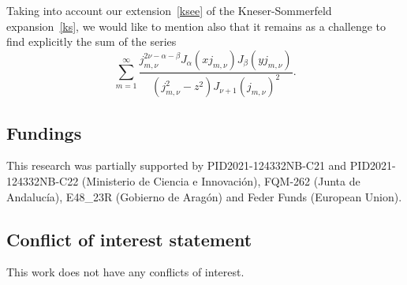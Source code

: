 \documentclass[10pt,leqno,a4paper]{article}
\theoremstyle{plain}
\numberwithin{equation}{section}
\begin{document}
Taking into account our extension~\eqref{ksee} of the Kneser-Sommerfeld expansion~\eqref{ks}, we would like to mention also that it remains as a challenge to find explicitly the sum of the series
\[ %
  \sum_{m=1}^\infty
  \frac{j_{m,\nu}^{2\nu-\alpha-\beta}J_\alpha(x j_{m,\nu})J_\beta(y j_{m,\nu})}
  {(j_{m,\nu}^{2}-z^2) J_{\nu+1}(j_{m,\nu})^2}.
\]

\subsection*{Fundings}
This research was partially supported by PID2021-124332NB-C21 and PID2021-124332NB-C22 (Minis\-te\-rio de Cien\-cia e Inno\-va\-ci\'on), FQM-262 (Jun\-ta de Anda\-lu\-c\'ia), E48\_23R (Go\-bier\-no de Ara\-g\'on) and Feder Funds (European Union).

\subsection*{Conflict of interest statement}
This work does not have any conflicts of interest.
\end{document}
